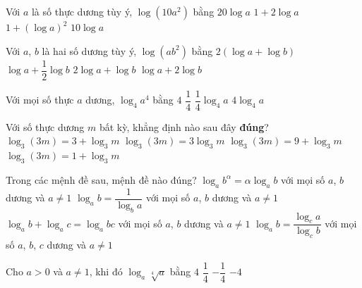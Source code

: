 \begin{ex}%
	Với $a$ là số thực dương tùy ý, $\log\left(10a^2\right)$  bằng
	\choice 
		{$20\log a$} 
		 {\True $1+2\log a$}
		{$1+\left(\log  a\right)^2$}
		 {$10\log a$}
\end{ex}

\begin{ex}%
	Với $a$, $b$ là hai số dương tùy  ý, $\log\left(a b^2\right)$ bằng
	\choice 
		{$2(\log a+\log  b)$}
		{$\log a+\dfrac{1}{2}\log b$} 
		{$2\log a+\log  b$}
		{\True  $\log a+2\log b$}
\end{ex}

\begin{ex}%
	Với mọi  số thực $a$ dương, $\log_4a^4$ bằng
	\choice 
		 {$4$}
		 {$\dfrac{1}{4}$}
		 {$\dfrac{1}{4}\log_4a$}
		{\True  $4\log_4a$}
\end{ex}

\begin{ex}%
	Với số thực dương  $m$ bất kỳ, khẳng định nào sau đây {\bf đúng}?
	 \choice
		{$\log_3(3m)=3+\log_3 m$} 
		{$\log_3(3m)=3\log_3  m$}
		 {$\log_3(3m)=9+\log_3 m$}
		{\True  $\log_3(3m)=1+\log_3 m$}
\end{ex}

\begin{ex}%
	Trong các mệnh đề sau, mệnh đề nào  đúng?
	 \choice
		{\True $\log_{a}{b^\alpha} = \alpha \log_{a}{b}$ với mọi số $a$, $b$ dương và $a  \neq 1$}
		 {$\log_{a}{b} = \dfrac{1}{\log_{b}{a}}$ với mọi số $a$, $b$ dương và $a \neq 1$}
		 {$\log_{a}{b} + \log_{a}{c} = \log_{a}{bc}$ với mọi số $a$, $b$ dương và $a \neq 1$}
		{$\log_{a}{b} = \dfrac{\log_{c}{a}}{\log_{c}{b}}$  với mọi số $a$, $b$, $c$ dương và $a \neq 1$}
	 \loigiai{
	 }
\end{ex}

\begin{ex}%
	Cho $a>0$ và $a\ne 1$,  khi đó ${\log }_a\sqrt[4]a$ bằng
	\choice 
		 {$4$}
		{\True $\dfrac{1}{4}$} 
		 {$-\dfrac{1}{4}$}
		 {$-4$}
\end{ex}

